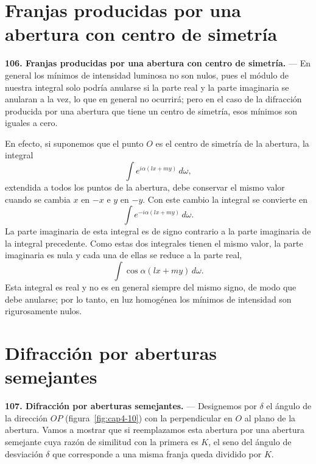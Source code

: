 \section{Franjas producidas por una abertura con centro de simetría}

\noindent\textbf{106. Franjas producidas por una abertura con centro de
simetría.} — En general los mínimos de intensidad luminosa no son nulos,
pues el módulo de nuestra integral solo podría anularse si la parte real
y la parte imaginaria se anularan a la vez, lo que en general no ocurrirá;
pero en el caso de la difracción producida por una abertura que tiene un
centro de simetría, esos mínimos son iguales a cero.

En efecto, si suponemos que el punto $O$ es el centro de simetría de la
abertura, la integral
\[
\int e^{i\alpha(lx+my)}\,d\omega,
\]
extendida a todos los puntos de la abertura, debe conservar el mismo
valor cuando se cambia $x$ en $-x$ e $y$ en $-y$. Con este cambio la
integral se convierte en
\[
\int e^{-i\alpha(lx+my)}\,d\omega.
\]
La parte imaginaria de esta integral es de signo contrario a la parte
imaginaria de la integral precedente. Como estas dos integrales tienen el
mismo valor, la parte imaginaria es nula y cada una de ellas se reduce a
la parte real,
\[
\int \cos\alpha(lx+my)\,d\omega.
\]
Esta integral es real y no es en general siempre del mismo signo, de modo
que debe anularse; por lo tanto, en luz homogénea los mínimos de
intensidad son rigurosamente nulos.

\section{Difracción por aberturas semejantes}

\noindent\textbf{107. Difracción por aberturas semejantes.} — Designemos
por $\delta$ el ángulo de la dirección $OP$ (figura~\ref{fig:cap4-10}) con
la perpendicular en $O$ al plano de la abertura. Vamos a mostrar que si
reemplazamos esta abertura por una abertura semejante cuya razón de
similitud con la primera es $K$, el seno del ángulo de desviación
$\delta$ que corresponde a una misma franja queda dividido por $K$.

